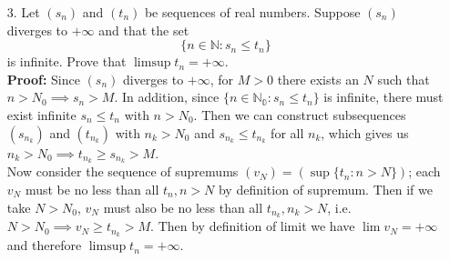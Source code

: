 \documentclass{article}
\begin{document}
\newpage
\begin{itemize}
    \item [3.] Let $(s_n)$ and $(t_n)$ be sequences of real numbers. Suppose $(s_n)$ diverges to $+\infty$ and that the set \[\{n\in\mathbb{N}:s_n\leq t_n\}\] is infinite. Prove that $\limsup t_n=+\infty$.\\\textbf{Proof: } Since $(s_n)$ diverges to $+\infty$, for $M>0$ there exists an $N$ such that $n>N_0\implies s_n>M$. In addition, since $\{n\in\mathbb{N_0}:s_n\leq t_n\}$ is infinite, there must exist infinite $s_n\leq t_n$ with $n>N_0$. Then we can construct subsequences $(s_{n_k})$ and $(t_{n_k})$ with $n_k>N_0$ and $s_{n_k}\leq t_{n_k}$ for all $n_k$, which gives us $n_k>N_0\implies t_{n_k}\geq s_{n_k}>M$.\\
          Now consider the sequence of supremums $(v_N)=(\sup\{t_n:n>N\})$; each $v_N$ must be no less than all $t_n, n>N$ by definition of supremum. Then if we take $N>N_0$, $v_N$ must also be no less than all $t_{n_k}, n_k>N$, i.e. $N>N_0\implies v_N\geq t_{n_k}>M$. Then by definition of limit we have $\lim v_N=+\infty$ and therefore $\limsup t_n=+\infty$.
\end{itemize}
\end{document}
